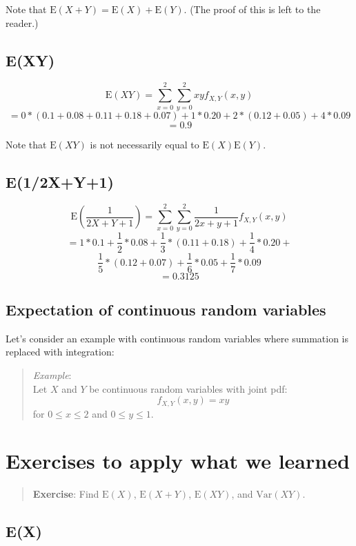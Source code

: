 \documentclass[
  letterpaper,
  DIV=11,
  numbers=noendperiod]{scrreprt}
\begin{document}
Note that \(\mbox{E}(X+Y)=\mbox{E}(X)+\mbox{E}(Y)\). (The proof of this
is left to the reader.)

\subsection{E(XY)}\label{exy-1}

\[
\mbox{E}(XY)=\sum_{x=0}^2\sum_{y=0}^2 xyf_{X,Y}(x,y) 
\] \[
= 0*(0.1+0.08+0.11+0.18+0.07)+1*0.20 +2*(0.12+0.05)+4*0.09
\] \[
= 0.9
\]

Note that \(\mbox{E}(XY)\) is not necessarily equal to
\(\mbox{E}(X)\mbox{E}(Y)\).

\subsection{E(1/2X+Y+1)}\label{e12xy1}

\[
\mbox{E}\left(\frac{1}{2X+Y+1}\right) = \sum_{x=0}^2\sum_{y=0}^2 \frac{1}{2x+y+1}f_{X,Y}(x,y) 
\] \[
= 1*0.1+\frac{1}{2}*0.08+\frac{1}{3}*(0.11+0.18)+\frac{1}{4}*0.20 + \]
\[
\frac{1}{5}*(0.12+0.07)+\frac{1}{6}*0.05+\frac{1}{7}*0.09 
\] \[
= 0.3125
\]

\subsection{Expectation of continuous random
variables}\label{expectation-of-continuous-random-variables}

Let's consider an example with continuous random variables where
summation is replaced with integration:

\begin{quote}
\emph{Example}:\\
Let \(X\) and \(Y\) be continuous random variables with joint pdf: \[
f_{X,Y}(x,y)=xy
\] for \(0\leq x \leq 2\) and \(0 \leq y \leq 1\).
\end{quote}

\section{Exercises to apply what we
learned}\label{exercises-to-apply-what-we-learned-1}

\begin{quote}
\textbf{Exercise}: Find \(\mbox{E}(X)\), \(\mbox{E}(X+Y)\),
\(\mbox{E}(XY)\), and \(\mbox{Var}(XY)\).
\end{quote}

\subsection{E(X)}\label{ex}
\end{document}
